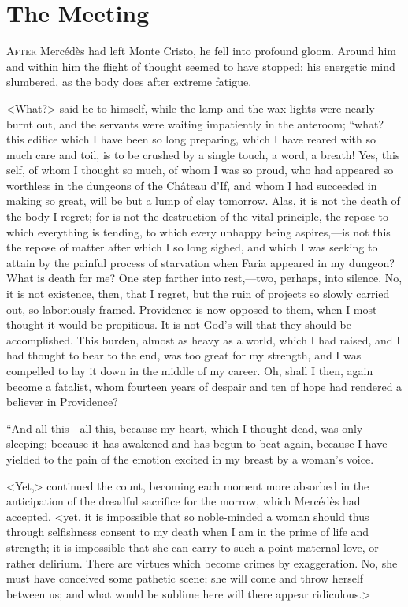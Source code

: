 \chapter{The Meeting} 

 \lettrine{A}{fter} Mercédès had left Monte Cristo, he fell into profound gloom. Around him and within him the flight of thought seemed to have stopped; his energetic mind slumbered, as the body does after extreme fatigue. 

 <What?> said he to himself, while the lamp and the wax lights were nearly burnt out, and the servants were waiting impatiently in the anteroom; “what? this edifice which I have been so long preparing, which I have reared with so much care and toil, is to be crushed by a single touch, a word, a breath! Yes, this self, of whom I thought so much, of whom I was so proud, who had appeared so worthless in the dungeons of the Château d'If, and whom I had succeeded in making so great, will be but a lump of clay tomorrow. Alas, it is not the death of the body I regret; for is not the destruction of the vital principle, the repose to which everything is tending, to which every unhappy being aspires,—is not this the repose of matter after which I so long sighed, and which I was seeking to attain by the painful process of starvation when Faria appeared in my dungeon? What is death for me? One step farther into rest,—two, perhaps, into silence. No, it is not existence, then, that I regret, but the ruin of projects so slowly carried out, so laboriously framed. Providence is now opposed to them, when I most thought it would be propitious. It is not God's will that they should be accomplished. This burden, almost as heavy as a world, which I had raised, and I had thought to bear to the end, was too great for my strength, and I was compelled to lay it down in the middle of my career. Oh, shall I then, again become a fatalist, whom fourteen years of despair and ten of hope had rendered a believer in Providence? 

 “And all this—all this, because my heart, which I thought dead, was only sleeping; because it has awakened and has begun to beat again, because I have yielded to the pain of the emotion excited in my breast by a woman's voice. 

 <Yet,> continued the count, becoming each moment more absorbed in the anticipation of the dreadful sacrifice for the morrow, which Mercédès had accepted, <yet, it is impossible that so noble-minded a woman should thus through selfishness consent to my death when I am in the prime of life and strength; it is impossible that she can carry to such a point maternal love, or rather delirium. There are virtues which become crimes by exaggeration. No, she must have conceived some pathetic scene; she will come and throw herself between us; and what would be sublime here will there appear ridiculous.> 


